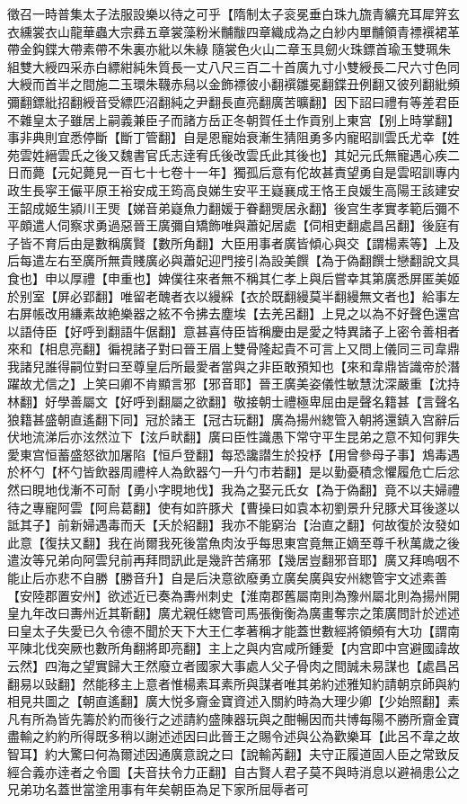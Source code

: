 徵召一時普集太子法服設樂以待之可乎【隋制太子衮冕垂白珠九旒青纊充耳犀笄玄衣纁裳衣山龍華蟲大宗彞五章裳藻粉米黼黻四章織成為之白紗内單黼領青褾襈裙革帶金鈎鍱大帶素帶不朱裏亦紕以朱綠隨裳色火山二章玉具劒火珠鏢首瑜玉雙珮朱組雙大綬四采赤白縹紺純朱質長一丈八尺三百二十首廣九寸小雙綬長二尺六寸色同大綬而首半之間施二玉環朱韈赤舄以金飾褾彼小翻襈雛冕翻鍱丑例翻又彼列翻紕頻彌翻鏢紕招翻綬音受縹匹沼翻純之尹翻長直亮翻廣苦曠翻】因下詔曰禮有等差君臣不雜皇太子雖居上嗣義兼臣子而諸方岳正冬朝賀任土作貢别上東宫【别上時掌翻】事非典則宜悉停斷【斷丁管翻】自是恩寵始衰漸生猜阻勇多内寵昭訓雲氏尤幸【姓苑雲姓縉雲氏之後又魏書官氏志逹宥氏後改雲氏此其後也】其妃元氏無寵遇心疾二日而薨【元妃薨見一百七十七卷十一年】獨孤后意有佗故甚責望勇自是雲昭訓專内政生長寜王儼平原王裕安成王筠高良娣生安平王嶷襄成王恪王良媛生高陽王該建安王韶成姬生潁川王煚【娣音弟嶷魚力翻媛于眷翻煚居永翻】後宫生孝實孝範后彌不平頗遣人伺察求勇過惡晉王廣彌自矯飾唯與蕭妃居處【伺相吏翻處昌呂翻】後庭有子皆不育后由是數稱廣賢【數所角翻】大臣用事者廣皆傾心與交【謂楊素等】上及后每遣左右至廣所無貴賤廣必與蕭妃迎門接引為設美饌【為于偽翻饌士戀翻說文具食也】申以厚禮【申重也】婢僕往來者無不稱其仁孝上與后嘗幸其第廣悉屏匿美姬於别室【屏必郢翻】唯留老醜者衣以縵綵【衣於既翻縵莫半翻縵無文者也】給事左右屏帳改用縑素故絶樂器之絃不令拂去塵埃【去羌呂翻】上見之以為不好聲色還宫以語侍臣【好呼到翻語牛倨翻】意甚喜侍臣皆稱慶由是愛之特異諸子上密令善相者來和【相息亮翻】徧視諸子對曰晉王眉上雙骨隆起貴不可言上又問上儀同三司韋鼎我諸兒誰得嗣位對曰至尊皇后所最愛者當與之非臣敢預知也【來和韋鼎皆識帝於潛躍故尤信之】上笑曰卿不肯顯言邪【邪音耶】晉王廣美姿儀性敏慧沈深嚴重【沈持林翻】好學善屬文【好呼到翻屬之欲翻】敬接朝士禮極卑屈由是聲名籍甚【言聲名狼籍甚盛朝直遙翻下同】冠於諸王【冠古玩翻】廣為揚州緫管入朝將還鎮入宫辭后伏地流涕后亦泫然泣下【泫戶畎翻】廣曰臣性識愚下常守平生昆弟之意不知何罪失愛東宫恒蓄盛怒欲加屠陷【恒戶登翻】每恐讒譛生於投杼【用曾參母子事】鴆毒遇於杯勺【杯勺皆飲器周禮梓人為飲器勺一升勺市若翻】是以勤憂積念懼履危亡后忿然曰睍地伐漸不可耐【勇小字睍地伐】我為之娶元氏女【為于偽翻】竟不以夫婦禮待之專寵阿雲【阿烏葛翻】使有如許豚犬【曹操曰如袁本初劉景升兒豚犬耳後遂以詆其子】前新婦遇毒而夭【夭於紹翻】我亦不能窮治【治直之翻】何故復於汝發如此意【復扶又翻】我在尚爾我死後當魚肉汝乎每思東宫竟無正嫡至尊千秋萬歲之後遣汝等兄弟向阿雲兒前再拜問訊此是幾許苦痛邪【幾居豈翻邪音耶】廣又拜嗚咽不能止后亦悲不自勝【勝音升】自是后決意欲廢勇立廣矣廣與安州緫管宇文述素善【安陸郡置安州】欲述近已奏為夀州刺史【淮南郡舊屬南則為豫州屬北則為揚州開皇九年改曰夀州近其靳翻】廣尤親任緫管司馬張衡衡為廣畫奪宗之策廣問計於述述曰皇太子失愛已久令德不聞於天下大王仁孝著稱才能蓋世數經將領頻有大功【謂南平陳北伐突厥也數所角翻將即亮翻】主上之與内宫咸所鍾愛【内宫即中宫避國諱故云然】四海之望實歸大王然廢立者國家大事處人父子骨肉之間誠未易謀也【處昌呂翻易以䜴翻】然能移主上意者惟楊素耳素所與謀者唯其弟約述雅知約請朝京師與約相見共圖之【朝直遙翻】廣大悦多齎金寶資述入關約時為大理少卿【少始照翻】素凡有所為皆先籌於約而後行之述請約盛陳器玩與之酣暢因而共博每陽不勝所齎金寶盡輸之約約所得既多稍以謝述述因曰此晉王之賜令述與公為歡樂耳【此呂不韋之故智耳】約大驚曰何為爾述因通廣意說之曰【說輸芮翻】夫守正履道固人臣之常致反經合義亦逹者之令圖【夫音扶令力正翻】自古賢人君子莫不與時消息以避禍患公之兄弟功名蓋世當塗用事有年矣朝臣為足下家所屈辱者可